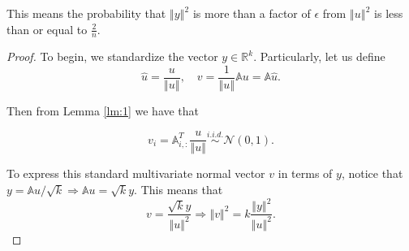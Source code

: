 \documentclass{article}
\begin{document}
This means the probability that $\left\Vert y \right\Vert^2$ is more than a factor of $\epsilon$ from $\left\Vert u \right\Vert^2$ is less than or equal to $\frac{2}{n}$.

\begin{proof}

To begin, we standardize the vector $y \in \mathbb{R}^k$. Particularly, let us define
$$ \hat{u} = \frac{u}{\left\Vert u \right\Vert}, \quad v = \frac{1}{\left\Vert u \right\Vert}\mathbb{A}u = \mathbb{A} \hat{u}.$$

Then from Lemma \ref{lm:1} we have that

$$ v_i =  \mathbb{A}_{i,:}^T \frac{u}{\left\Vert u \right\Vert} \overset{i.i.d.}{\sim} \mathcal{N}(0, 1).$$

To express this standard multivariate normal vector $v$ in terms of $y$, notice that $y = \mathbb{A}u/\sqrt{k} \Rightarrow \mathbb{A}u = \sqrt{k}y$. This means that
$$ v = \frac{\sqrt{k}y}{\left\Vert u \right\Vert^2} \Rightarrow \left\Vert v \right\Vert^2 = k \frac{\left\Vert y \right\Vert^2}{\left\Vert u \right\Vert^2}.$$


\end{proof}
\end{document}

